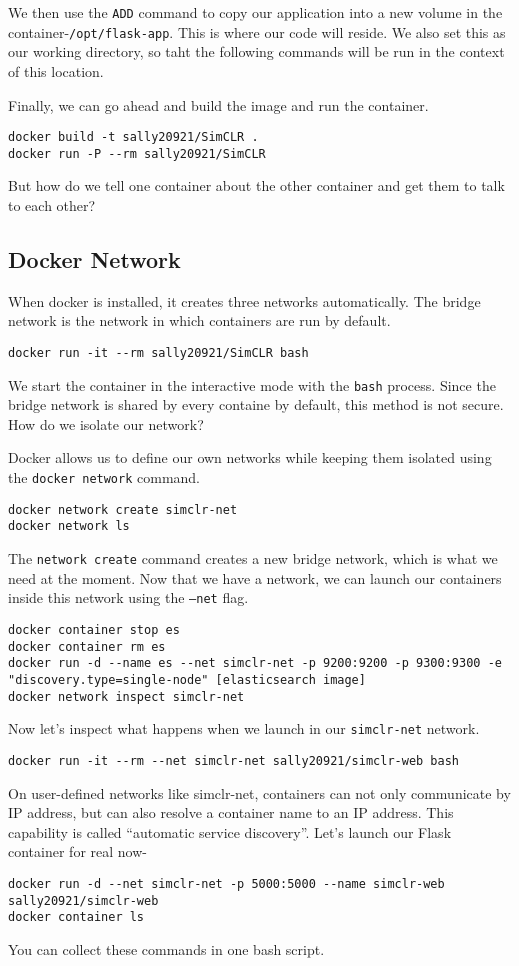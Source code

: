 \documentclass[twoside,twocolumn]{article}
\begin{document}
We then use the \texttt{ADD} command to copy our application into a new volume in the container-\texttt{/opt/flask-app}.
This is where our code will reside. We also set this as our working directory, so taht the following commands will be run in the context of this location.

Finally, we can go ahead and build the image and run the container.
\begin{verbatim}
docker build -t sally20921/SimCLR .
docker run -P --rm sally20921/SimCLR 
\end{verbatim}
But how do we tell one container about the other container and get them to talk to each other?

\subsection{Docker Network}
When docker is installed, it creates three networks automatically.
The bridge network is the network in which containers are run by default.
\begin{verbatim}
docker run -it --rm sally20921/SimCLR bash
\end{verbatim}
We start the container in the interactive mode with the \texttt{bash} process. 
Since the bridge network is shared by every containe by default, this method is not secure. How do we isolate our network?

Docker allows us to define our own networks while keeping them isolated using the \texttt{docker network} command.
\begin{verbatim}
docker network create simclr-net
docker network ls
\end{verbatim}
The \texttt{network create} command creates a new bridge network, which is what we need at the moment.
Now that we have a network, we can launch our containers inside this network using the \texttt{--net} flag.
\begin{verbatim}
docker container stop es
docker container rm es
docker run -d --name es --net simclr-net -p 9200:9200 -p 9300:9300 -e "discovery.type=single-node" [elasticsearch image]
docker network inspect simclr-net
\end{verbatim}
Now let's inspect what happens when we launch in our \texttt{simclr-net} network.
\begin{verbatim}
docker run -it --rm --net simclr-net sally20921/simclr-web bash
\end{verbatim}
On user-defined networks like simclr-net, containers can not only communicate by IP address, but can also resolve a container name to an IP address.
This capability is called ``automatic service discovery''.
Let's launch our Flask container for real now-
\begin{verbatim}
docker run -d --net simclr-net -p 5000:5000 --name simclr-web sally20921/simclr-web
docker container ls
\end{verbatim}
You can collect these commands in one bash script.
\end{document}
